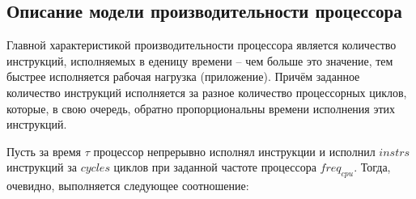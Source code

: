 


\subsection{Описание модели производительности процессора}

    Главной характеристикой производительности процессора является количество инструкций,
    исполняемых в еденицу времени -- чем больше это значение, тем быстрее исполняется рабочая
    нагрузка (приложение). Причём заданное количество инструкций исполняется за разное количество
    процессорных циклов, которые, в свою очередь, обратно пропорциональны времени исполнения
    этих инструкций.

    Пусть за время $\tau$ процессор непрерывно исполнял инструкции и исполнил $instrs$ инструкций
    за $cycles$ циклов при заданной частоте процессора $freq_{cpu}$.
    Тогда, очевидно, выполняется следующее соотношение:

